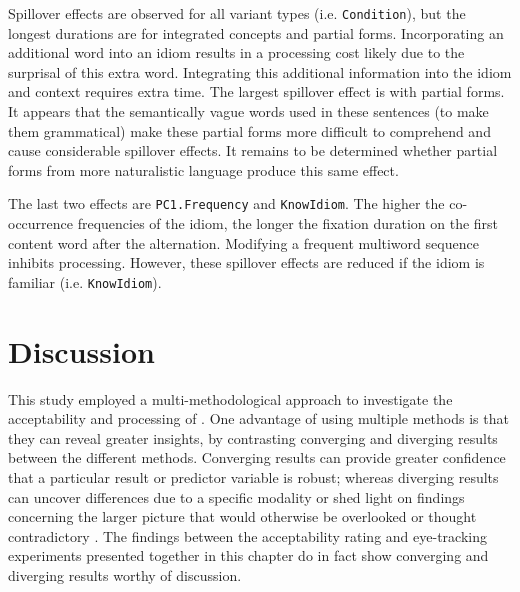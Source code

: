 \documentclass[output=paper,modfonts,nonflat]{langsci/langscibook}
\begin{document}
Spillover effects are observed for all variant types (i.e. \texttt{Condition}), but the longest durations are for integrated concepts and partial forms. Incorporating an additional word into an idiom results in a processing cost likely due to the surprisal of this extra word. Integrating this additional information into the idiom and context requires extra time. The largest spillover effect is with partial forms. It appears that the semantically vague words used in these sentences (to make them grammatical) make these partial forms more difficult to comprehend and cause considerable spillover effects. It remains to be determined whether partial forms from more naturalistic language produce this same effect.

The last two effects are \texttt{PC1.Frequency} and \texttt{KnowIdiom}. The higher the co-occurrence frequencies of the idiom, the longer the fixation duration on the first content word after the alternation. Modifying a frequent multiword sequence inhibits processing. However, these spillover effects are reduced if the idiom is familiar (i.e. \texttt{KnowIdiom}).  






\section{Discussion} 

This study employed a multi-methodological  approach to investigate the acceptability and processing of . One advantage of using multiple methods is that they can reveal greater insights, by contrasting converging and diverging results between the different methods. Converging results can provide greater confidence that a particular result or predictor variable is robust; whereas diverging results can uncover differences due to a specific modality or shed light on findings concerning the larger picture that would otherwise be overlooked or thought contradictory \citep{ArppeJarvikivi2007}. The findings between the acceptability rating and eye-tracking experiments presented together in this chapter do in fact show converging and diverging results  worthy of discussion.
\end{document}
